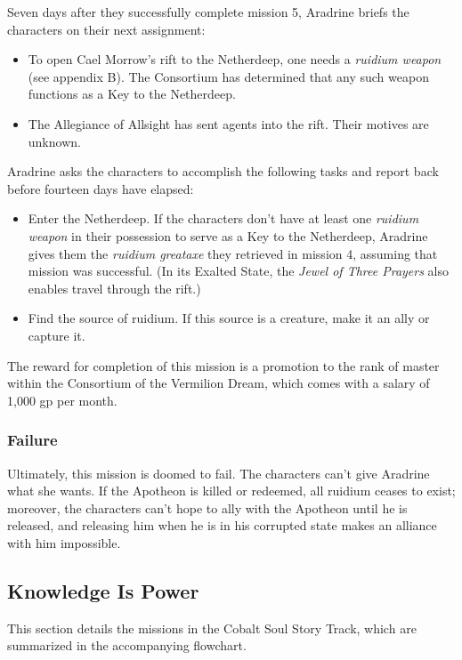 \documentclass[10pt,a4paper,twoside,fancy,bg=print,twocolumn,openany,nodeprecatedcode]{dndbook}
\begin{document}
Seven days after they successfully complete mission 5, Aradrine briefs the characters on their next assignment:


\begin{itemize}
\item To open Cael Morrow's rift to the Netherdeep, one needs a \textit{ruidium weapon} (see appendix B). The Consortium has determined that any such weapon functions as a Key to the Netherdeep.
\item The Allegiance of Allsight has sent agents into the rift. Their motives are unknown.
\end{itemize}

Aradrine asks the characters to accomplish the following tasks and report back before fourteen days have elapsed:


\begin{itemize}
\item Enter the Netherdeep. If the characters don't have at least one \textit{ruidium weapon} in their possession to serve as a Key to the Netherdeep, Aradrine gives them the \textit{ruidium greataxe} they retrieved in mission 4, assuming that mission was successful. (In its Exalted State, the \textit{Jewel of Three Prayers} also enables travel through the rift.)
\item Find the source of ruidium. If this source is a creature, make it an ally or capture it.
\end{itemize}

The reward for completion of this mission is a promotion to the rank of master within the Consortium of the Vermilion Dream, which comes with a salary of 1,000 gp per month.

\subsubsection{Failure}
Ultimately, this mission is doomed to fail. The characters can't give Aradrine what she wants. If the Apotheon is killed or redeemed, all ruidium ceases to exist; moreover, the characters can't hope to ally with the Apotheon until he is released, and releasing him when he is in his corrupted state makes an alliance with him impossible.

\subsection{Knowledge Is Power}
This section details the missions in the Cobalt Soul Story Track, which are summarized in the accompanying flowchart.
\end{document}
